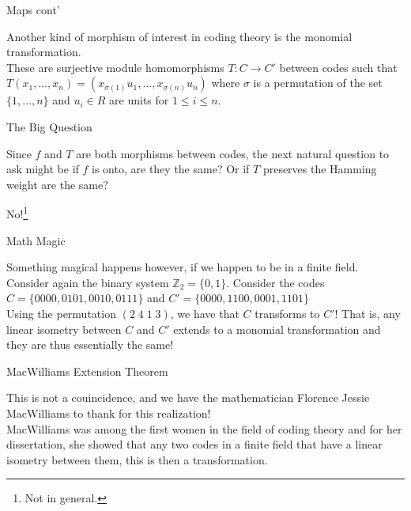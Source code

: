 \documentclass{beamer}
\begin{document}
\begin{frame}{Maps cont'}
    
    Another kind of morphism of interest in coding theory is the monomial transformation.\\
    These are surjective module homomorphisms $T:C\to C'$ between codes such that
    $T(x_1,\ldots,x_n)=(x_{\sigma(1)}u_1,\ldots,x_{\sigma(n)}u_n)$ where $\sigma$ is a permutation of
    the set $\{1,\ldots,n\}$ and $u_i\in R$ are units for $1\leq i\leq n$.

\end{frame}

\begin{frame}{The Big Question}
    
    Since $f$ and $T$ are both morphisms between codes, the next natural question to ask might be if $f$
    is onto, are they the same? Or if $T$ preserves the Hamming weight are the same?

\end{frame}

\begin{frame}
    
    \begin{center}
        No!\footnote{Not in general.}
    \end{center}

\end{frame}

\begin{frame}{Math Magic}
    
    Something magical happens however, if we happen to be in a finite field.\\
    Consider again the binary system $\mathbb{Z}_2=\{0,1\}$. Consider the codes
    $C=\{0000,0101,0010,0111\}$ and $C'=\{0000,1100,0001,1101\}$\\
    Using the permutation $(2\;4\;1\;3)$, we have that $C$ transforms to $C'$! That is, any linear
    isometry between $C$ and $C'$ extends to a monomial transformation and they are thus essentially the
    same!

\end{frame}

\begin{frame}{MacWilliams Extension Theorem}
    
    This is not a couincidence, and we have the mathematician Florence Jessie MacWilliams to thank for
    this realization!\\
    MacWilliams was among the first women in the field of coding theory and for her dissertation, she showed
    that any two codes in a finite field that have a linear isometry between them, this is then a
    transformation.

\end{frame}
\end{document}
